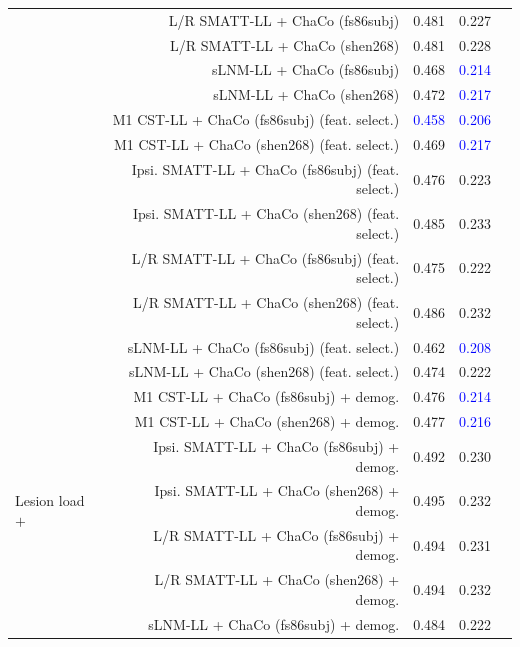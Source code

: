 \documentclass[10pt]{article}
\def\Plus{\texttt{+}}
\newcommand{\colorProcessBlue}[1]{\textcolor{ProcessBlue}{#1}}
\newcommand{\colorNavyBlue}[1]{\textcolor{NavyBlue}{#1}}
\newcommand{\colorBlue}[1]{\textcolor{Blue}{#1}}
\begin{document}
\begin{table}[h]
\begin{tabular}{lrrrr}
 & L/R SMATT-LL + ChaCo (fs86subj) & \colorNavyBlue{0.481} & \colorNavyBlue{0.227} \\
 & L/R SMATT-LL + ChaCo (shen268) & \colorNavyBlue{0.481} & \colorNavyBlue{0.228} \\
 & sLNM-LL + ChaCo (fs86subj) & \colorNavyBlue{0.468} & \colorBlue{0.214} \\
 & sLNM-LL + ChaCo (shen268) & \colorNavyBlue{0.472} & \colorBlue{0.217} \\
 & M1 CST-LL + ChaCo (fs86subj) (feat. select.) & \colorBlue{0.458} & \colorBlue{0.206} \\
 & M1 CST-LL + ChaCo (shen268) (feat. select.) & \colorNavyBlue{0.469} & \colorBlue{0.217} \\
 & Ipsi. SMATT-LL + ChaCo (fs86subj) (feat. select.) & \colorNavyBlue{0.476} & \colorNavyBlue{0.223} \\
 & Ipsi. SMATT-LL + ChaCo (shen268) (feat. select.) & \colorNavyBlue{0.485} & \colorProcessBlue{0.233} \\
 & L/R SMATT-LL + ChaCo (fs86subj) (feat. select.) & \colorNavyBlue{0.475} & \colorNavyBlue{0.222} \\
 & L/R SMATT-LL + ChaCo (shen268) (feat. select.) & \colorNavyBlue{0.486} & \colorProcessBlue{0.232} \\
 & sLNM-LL + ChaCo (fs86subj) (feat. select.) & \colorNavyBlue{0.462} & \colorBlue{0.208} \\
 & sLNM-LL + ChaCo (shen268) (feat. select.) & \colorNavyBlue{0.474} & \colorNavyBlue{0.222} \\
 \hline
\multirow[t]{16}{*}{Lesion load $\Plus$} & M1 CST-LL + ChaCo (fs86subj) + demog. & \colorNavyBlue{0.476} & \colorBlue{0.214} \\
 ChaCo $\Plus$ & M1 CST-LL + ChaCo (shen268) + demog. & \colorNavyBlue{0.477} & \colorBlue{0.216} \\
 Demographics & Ipsi. SMATT-LL + ChaCo (fs86subj) + demog. & \colorProcessBlue{0.492} & \colorProcessBlue{0.230} \\
 & Ipsi. SMATT-LL + ChaCo (shen268) + demog. & \colorProcessBlue{0.495} & \colorProcessBlue{0.232} \\
 & L/R SMATT-LL + ChaCo (fs86subj) + demog. & \colorProcessBlue{0.494} & \colorProcessBlue{0.231} \\
 & L/R SMATT-LL + ChaCo (shen268) + demog. & \colorProcessBlue{0.494} & \colorProcessBlue{0.232} \\
 & sLNM-LL + ChaCo (fs86subj) + demog. & \colorNavyBlue{0.484} & \colorNavyBlue{0.222} \\

\end{tabular}
\end{table}
\end{document}
